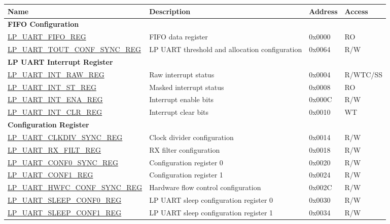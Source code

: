\begin{longtable}{ | p{6.6cm} | p{6.5cm} | p{1.3cm} | p{1.6cm} | }
\hline\rowcolor{lightgray}
Name & Description &  Address & Access \\ \hline
\endhead
\multicolumn{4}{|l|}{\textbf{FIFO Configuration}} \\ \hline
\hyperref[regdesc:LPUARTFIFOREG]{LP\_UART\_FIFO\_REG} & FIFO data register & 0x0000 & RO \\ \hline
\hyperref[regdesc:LPUARTTOUTCONFSYNCREG]{LP\_UART\_TOUT\_CONF\_SYNC\_REG} & LP UART threshold and allocation configuration & 0x0064 & R/W \\ \hline
\multicolumn{4}{|l|}{\textbf{LP UART Interrupt Register}} \\ \hline
\hyperref[regdesc:LPUARTINTRAWREG]{LP\_UART\_INT\_RAW\_REG} & Raw interrupt status & 0x0004 & R/WTC/SS \\ \hline
\hyperref[regdesc:LPUARTINTSTREG]{LP\_UART\_INT\_ST\_REG} & Masked interrupt status & 0x0008 & RO \\ \hline
\hyperref[regdesc:LPUARTINTENAREG]{LP\_UART\_INT\_ENA\_REG} & Interrupt enable bits & 0x000C & R/W \\ \hline
\hyperref[regdesc:LPUARTINTCLRREG]{LP\_UART\_INT\_CLR\_REG} & Interrupt clear bits & 0x0010 & WT \\ \hline
\multicolumn{4}{|l|}{\textbf{Configuration Register}} \\ \hline
\hyperref[regdesc:LPUARTCLKDIVSYNCREG]{LP\_UART\_CLKDIV\_SYNC\_REG} & Clock divider configuration & 0x0014 & R/W \\ \hline
\hyperref[regdesc:LPUARTRXFILTREG]{LP\_UART\_RX\_FILT\_REG} & RX filter configuration & 0x0018 & R/W \\ \hline
\hyperref[regdesc:LPUARTCONF0SYNCREG]{LP\_UART\_CONF0\_SYNC\_REG} & Configuration register 0 & 0x0020 & R/W \\ \hline
\hyperref[regdesc:LPUARTCONF1REG]{LP\_UART\_CONF1\_REG} & Configuration register 1 & 0x0024 & R/W \\ \hline
\hyperref[regdesc:LPUARTHWFCCONFSYNCREG]{LP\_UART\_HWFC\_CONF\_SYNC\_REG} & Hardware flow control configuration & 0x002C & R/W \\ \hline
\hyperref[regdesc:LPUARTSLEEPCONF0REG]{LP\_UART\_SLEEP\_CONF0\_REG} & LP UART sleep configuration register 0 & 0x0030 & R/W \\ \hline
\hyperref[regdesc:LPUARTSLEEPCONF1REG]{LP\_UART\_SLEEP\_CONF1\_REG} & LP UART sleep configuration register 1 & 0x0034 & R/W \\ \hline

\end{longtable}
